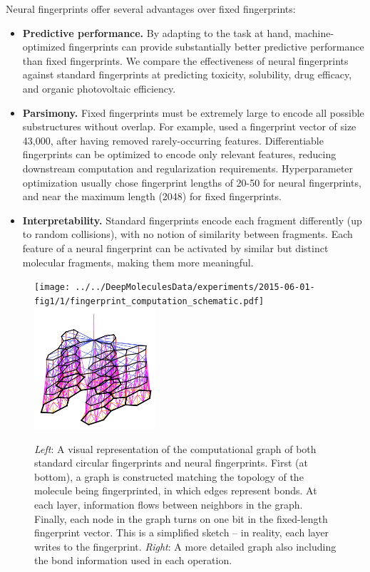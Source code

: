 \documentclass{article}
\begin{document}
Neural fingerprints offer several advantages over fixed fingerprints:
\begin{itemize}
\item {\bf Predictive performance.}
By adapting to the task at hand, machine-optimized fingerprints can provide substantially better predictive performance than fixed fingerprints.
We compare the effectiveness of neural fingerprints against standard fingerprints at predicting toxicity, solubility, drug efficacy, and organic photovoltaic efficiency.
\item {\bf Parsimony.}
Fixed fingerprints must be extremely large to encode all possible substructures without overlap.
For example, \cite{unterthinerdeep} used a fingerprint vector of size 43,000, after having removed rarely-occurring features.
Differentiable fingerprints can be optimized to encode only relevant features, reducing downstream computation and regularization requirements.
Hyperparameter optimization usually chose fingerprint lengths of 20-50 for neural fingerprints, and near the maximum length (2048) for fixed fingerprints.
\item {\bf Interpretability.}
Standard fingerprints encode each fragment differently (up to random collisions), with no notion of similarity between fragments.
Each feature of a neural fingerprint can be activated by similar but distinct molecular fragments, making them more meaningful.
\end{itemize}

\begin{figure}
\centerline{\texttt{[image: ../../DeepMoleculesData/experiments/2015-06-01-fig1/1/fingerprint\_computation\_schematic.pdf]}
\hspace{2em}
\includegraphics[width=0.4\textwidth, clip, trim=4mm 4mm 4mm 8mm]{figures/3d-nets/net1}}
\caption{\emph{Left}: A visual representation of the computational graph of both standard circular fingerprints and neural fingerprints.
First (at bottom), a graph is constructed matching the topology of the molecule being fingerprinted, in which edges represent bonds.
At each layer, information flows between neighbors in the graph.
Finally, each node in the graph turns on one bit in the fixed-length fingerprint vector.
This is a simplified sketch -- in reality, each layer writes to the fingerprint.
\emph{Right}: A more detailed graph also including the bond information used in each operation.}
\label{fig:architecture sketch}
\end{figure}
\end{document}
